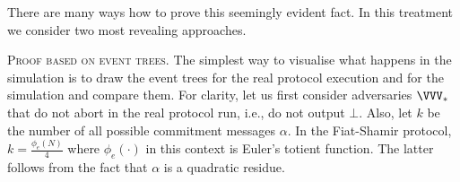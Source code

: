 \documentclass{crypto-exercise}
\begin{document}
\begin{solution}
There are many ways how to prove this seemingly evident fact. In this treatment we consider two most revealing approaches.

\vspace*{2ex}
\noindent
\textsc{Proof based on event trees.} The simplest way to visualise what happens in the simulation is to draw the event trees for  the real protocol execution and for the simulation and compare them. For clarity, let us first consider adversaries $\VVV_*$ that do not abort in the real protocol run, i.e., do not output $\bot$. Also, let $k$ be the number of all possible commitment messages $\alpha$. In the Fiat-Shamir protocol, $k=\frac{\phi_e(N)}{4}$ where $\phi_e(\cdot)$ in this context is Euler's totient function. The latter follows from the fact that $\alpha$ is a quadratic residue.   


\end{solution}
\end{document}

